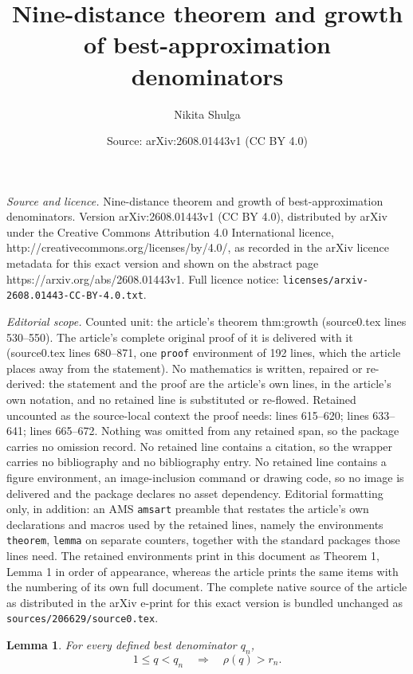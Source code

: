 \documentclass[10pt,a4paper]{amsart}
\title{Nine-distance theorem and growth of best-approximation denominators}
\author{Nikita Shulga}
\date{Source: arXiv:2608.01443v1 (CC BY 4.0)}
\newtheorem{lemma}{Lemma}
\begin{document}
\maketitle

\noindent\emph{Source and licence.} Nine-distance theorem and growth of best-approximation denominators. Version arXiv:2608.01443v1 (CC BY 4.0), distributed by arXiv under the Creative Commons Attribution 4.0 International licence, http://creativecommons.org/licenses/by/4.0/, as recorded in the arXiv licence metadata for this exact version and shown on the abstract page https://arxiv.org/abs/2608.01443v1. Full licence notice: \texttt{licenses/arxiv-2608.01443-CC-BY-4.0.txt}.\par\smallskip

\noindent\textit{Editorial scope.} Counted unit: the article's theorem thm:growth (source0.tex lines 530--550). The article's complete original proof of it is delivered with it (source0.tex lines 680--871, one \texttt{proof} environment of 192 lines, which the article places away from the statement). No mathematics is written, repaired or re-derived: the statement and the proof are the article's own lines, in the article's own notation, and no retained line is substituted or re-flowed.  Retained uncounted as the source-local context the proof needs: lines 615--620; lines 633--641; lines 665--672.  Nothing was omitted from any retained span, so the package carries no omission record.  No retained line contains a citation, so the wrapper carries no bibliography and no bibliography entry.  No retained line contains a figure environment, an image-inclusion command or drawing code, so no image is delivered and the package declares no asset dependency.  Editorial formatting only, in addition: an AMS \texttt{amsart} preamble that restates the article's own declarations and macros used by the retained lines, namely the environments \texttt{theorem}, \texttt{lemma} on separate counters, together with the standard packages those lines need.  The retained environments print in this document as Theorem 1, Lemma 1 in order of appearance, whereas the article prints the same items with the numbering of its own full document.  The complete native source of the article as distributed in the arXiv e-print for this exact version is bundled unchanged as \texttt{sources/206629/source0.tex}.
\begin{lemma}\label{lem:record}
For every defined best denominator $q_n$,
$$
 1\le q<q_n \quad\Longrightarrow\quad \rho(q)>r_n.
$$
\end{lemma}
\end{document}
